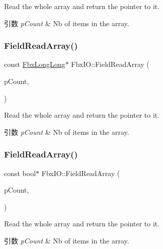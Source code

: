 Read the whole array and return the pointer to it. 
\begin{DoxyParams}{引数}
{\em p\+Count} & Nb of items in the array. \\
\hline
\end{DoxyParams}
\mbox{\label{class_fbx_i_o_a20d873aabea2cd1209b91c4ae81bfdd3}} 
\subsubsection{\texorpdfstring{Field\+Read\+Array()}{FieldReadArray()}\hspace{0.1cm}{\footnotesize\ttfamily [9/11]}}
{\footnotesize\ttfamily const \hyperlink{fbxtypes_8h_ac34da60c22b0a7e1156e5480da7d71f1}{Fbx\+Long\+Long}$\ast$ Fbx\+I\+O\+::\+Field\+Read\+Array (\begin{DoxyParamCaption}\item[{int \&}]{p\+Count,  }\item[{const \hyperlink{fbxtypes_8h_ac34da60c22b0a7e1156e5480da7d71f1}{Fbx\+Long\+Long} $\ast$}]{ }\end{DoxyParamCaption})}

Read the whole array and return the pointer to it. 
\begin{DoxyParams}{引数}
{\em p\+Count} & Nb of items in the array. \\
\hline
\end{DoxyParams}
\mbox{\label{class_fbx_i_o_a123c8555fc81a3d2b68e876d5da1e8a9}} 
\subsubsection{\texorpdfstring{Field\+Read\+Array()}{FieldReadArray()}\hspace{0.1cm}{\footnotesize\ttfamily [10/11]}}
{\footnotesize\ttfamily const bool$\ast$ Fbx\+I\+O\+::\+Field\+Read\+Array (\begin{DoxyParamCaption}\item[{int \&}]{p\+Count,  }\item[{const bool $\ast$}]{ }\end{DoxyParamCaption})}

Read the whole array and return the pointer to it. 
\begin{DoxyParams}{引数}
{\em p\+Count} & Nb of items in the array. \\
\hline
\end{DoxyParams}
\mbox{\label{class_fbx_i_o_a9888055efaf571a84ec3f067d55c2a21}} 
